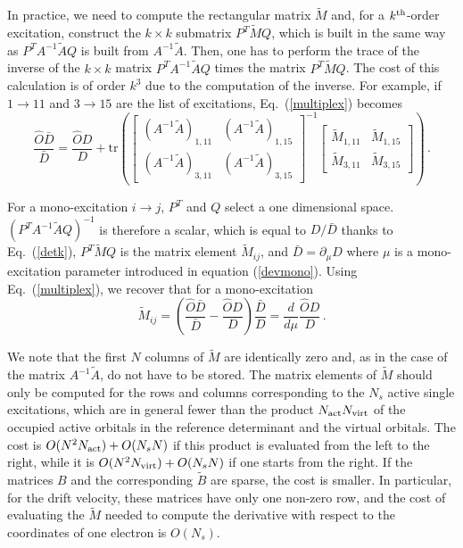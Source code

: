 \documentclass[aip,jcp,reprint,floatfix,onecolumn]{revtex4-1}
\def\tr{\text{tr}}
\def\A{A}
\def\aa{A^{-1}\tilde{A}}
\def\wdet{D}
\begin{document}
In practice, we  need to compute the rectangular matrix $\tilde{M}$
and, for a $k^{\rm th}$-order excitation, construct the $k\times k$ submatrix $P^T \tilde{M}Q$, which is built in the same way as $P^T A^{-1}\tilde{A}Q$ is built from $A^{-1}\tilde{A}$.
Then, one has to perform the trace of the inverse of the $k\times k$ matrix $P^T A^{-1}\tilde{A}Q$ times the matrix $P^T\tilde{M}Q$. The cost of this calculation is of order $k^3$  due to the computation of the inverse.
For example, if $1 \to 11$ and $3 \to 15$ are the list of excitations,
Eq.~(\ref{multiplex}) becomes
\begin{equation}
\frac{\hat{O}\bar{\wdet}}{\bar{\wdet}} = \frac{\hat{O}\wdet}{\wdet} +
 \tr \left( \left[ \begin{matrix} (\aa)_{1,11} & (\aa)_{1,15}   \\
                      (\aa)_{3,11} & (\aa)_{3,15}
\end{matrix} \right]^{-1} \left[
\begin{matrix} \tilde{M}_{1,11} & \tilde{M}_{1,15}   \\
                      \tilde{M}_{3,11} & \tilde{M}_{3,15}
\end{matrix}  \right]
 \right)\,.
\end{equation}

For a mono-excitation $i \to j$, $P^T$ and $Q$ select a one dimensional space.  $(P^T \A^{-1} \tilde{\A} Q)^{-1}$ is therefore a scalar, which is equal to ${\wdet}/{\bar{\wdet}}$
thanks to Eq.~(\ref{detk}),  $P^T \tilde{M} Q$ is the matrix element $\tilde{M}_{ij}$, and $\bar{D}=\partial_\mu D$ where $\mu$ is a mono-excitation parameter introduced in equation  (\ref {devmono}).
Using Eq.~(\ref{multiplex}), we recover that for a mono-excitation
\begin{equation}
\tilde{M}_{ij} = \left(\frac{{\hat{O}}\bar{\wdet}}{\bar{\wdet}}-\frac{{\hat{O}}\wdet}{\wdet}\right)\frac{\bar{\wdet}}{\wdet} = \frac{d}{d\mu} \frac{{\hat{O}}\wdet}{\wdet}\,.
\end{equation}

We note that the first $N$ columns of $\tilde{M}$ are identically zero and, as in the case of the matrix $A^{-1}\tilde{A}$, do not have to be stored.
The matrix elements of $\tilde{M}$
should only be computed for the rows and columns corresponding to the $N_s$ active single excitations, which are in general fewer than the product
$N_{\rm act}N_{\rm virt}$ of the occupied active orbitals in the reference determinant and the virtual orbitals.
The cost is $O(N^2 N_{\rm act})+ O(N_s N)$ if this product is evaluated from the left to the right, while it is $O(N^2 N_{\rm virt})+ O(N_s N)$ if one starts from the right.
 If the matrices $B$ and the corresponding $\tilde{B}$ are sparse, the cost is smaller. In particular, for the drift velocity, these matrices have only one non-zero row, and the cost of evaluating the $\tilde{M}$ needed to compute the derivative with respect to the coordinates of one electron is $O(N_s)$.
\end{document}
